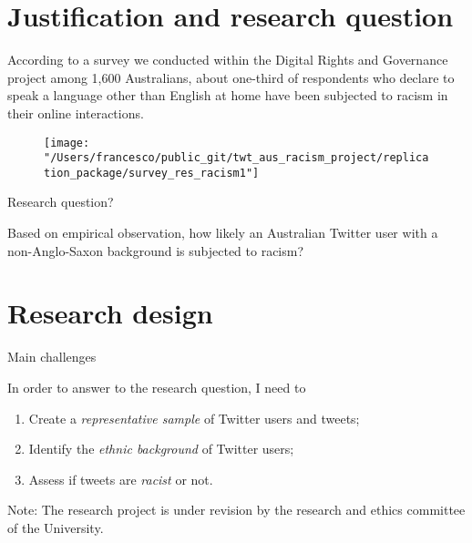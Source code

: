 \documentclass[serif, aspectratio=169]{beamer}
\title{\doctitle \docsubtitle} %
\author{
\large
\textsc{Francesco Bailo (with Gerard Goggin)}\\[2mm] 
\normalsize Department of Media and Communications, The University of Sydney \\
\InstitutePlace
}
\date{3 October 2018}
\begin{document}
{
\begin{frame}
  \titlepage
\end{frame}
}
\addtocounter{framenumber}{-1}

\frame{\tableofcontents}

\section{Justification and research question}

\begin{frame}

According to a survey we conducted within the Digital Rights and Governance project among 1,600 Australians, about one-third of respondents who declare to speak a language other than English at home have been subjected to racism in their online interactions. \autocite{goggin_digital_2017}

\begin{figure}
\texttt{[image: "/Users/francesco/public\_git/twt\_aus\_racism\_project/replication\_package/survey\_res\_racism1"]}
\end{figure}

\end{frame}

\begin{frame}
{Research question?}

Based on empirical observation, how likely an Australian Twitter user with a non-Anglo-Saxon background is subjected to racism?

\end{frame}


\section{Research design}

\begin{frame}
{Main challenges}

In order to answer to the research question, I need to

\begin{enumerate}

\item Create a \textit{representative sample} of Twitter users and tweets;

\item Identify the \textit{ethnic background} of Twitter users;

\item Assess if tweets are \textit{racist} or not.

\end{enumerate}

Note: The research project is under revision by the research and ethics committee of the University.

\end{frame}
\end{document}
